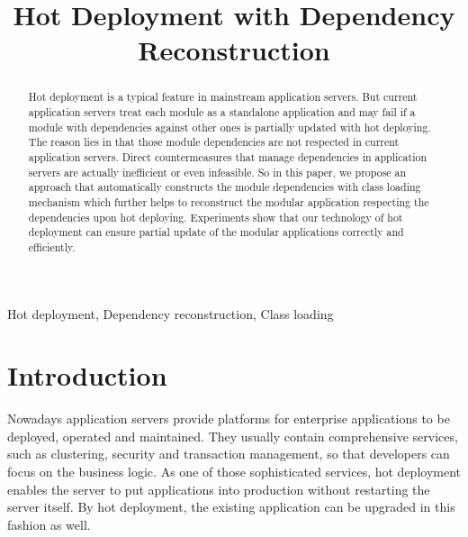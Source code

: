 \documentclass[conference]{IEEEtran}
\begin{document}
\title{Hot Deployment with Dependency Reconstruction}

\author{
}

\maketitle


\begin{abstract}
Hot deployment is a typical feature in mainstream application servers. But current application servers treat each module as a standalone application and may fail if a module with dependencies against other ones is partially updated with hot deploying. The reason lies in that those module dependencies are not respected in current application servers. Direct countermeasures that manage dependencies in application servers are actually inefficient or even infeasible. So in this paper, we propose an approach that automatically constructs the module dependencies with class loading mechanism which further helps to reconstruct the modular application respecting the dependencies upon hot deploying. Experiments show that our technology of hot deployment can ensure partial update of the modular applications correctly and efficiently.
\end{abstract}

\begin{IEEEkeywords}
Hot deployment, Dependency reconstruction, Class loading
\end{IEEEkeywords}


\IEEEpeerreviewmaketitle


\section{Introduction\label{sec:introduction}}

Nowadays application servers provide platforms for enterprise applications to be deployed, operated and maintained. They usually contain comprehensive services, such as clustering, security and transaction management, so that developers can focus on the business logic. As one of those sophisticated services, hot deployment enables the server to put applications into production without restarting the server itself. By hot deployment, the existing application can be upgraded in this fashion as well.
\end{document}
